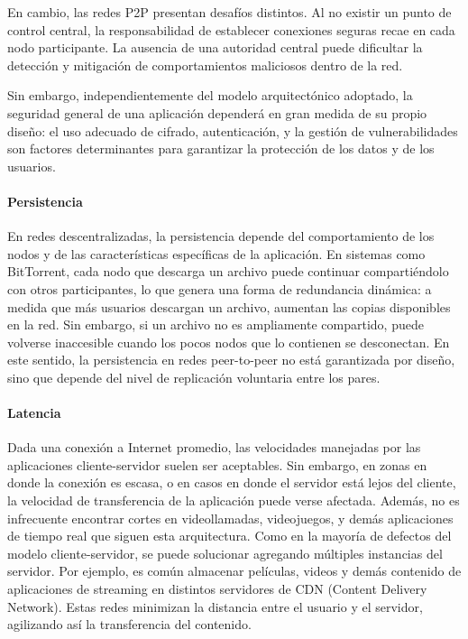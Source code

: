 En cambio, las redes P2P presentan desafíos distintos. Al no existir un punto de control central, la responsabilidad de establecer conexiones seguras recae en cada nodo participante. La ausencia de una autoridad central puede dificultar la detección y mitigación de comportamientos maliciosos dentro de la red.

Sin embargo, independientemente del modelo arquitectónico adoptado, la seguridad general de una aplicación dependerá en gran medida de su propio diseño: el uso adecuado de cifrado, autenticación, y la gestión de vulnerabilidades son factores determinantes para garantizar la protección de los datos y de los usuarios.

\paragraph{Persistencia}

En redes descentralizadas, la persistencia depende del comportamiento de los nodos y de las características específicas de la aplicación. En sistemas como BitTorrent, cada nodo que descarga un archivo puede continuar compartiéndolo con otros participantes, lo que genera una forma de redundancia dinámica: a medida que más usuarios descargan un archivo, aumentan las copias disponibles en la red. Sin embargo, si un archivo no es ampliamente compartido, puede volverse inaccesible cuando los pocos nodos que lo contienen se desconectan. En este sentido, la persistencia en redes peer-to-peer no está garantizada por diseño, sino que depende del nivel de replicación voluntaria entre los pares.

\paragraph{Latencia}
Dada una conexión a Internet promedio, las velocidades manejadas por las aplicaciones cliente-servidor suelen ser aceptables. Sin embargo, en zonas en donde la conexión es escasa, o en casos en donde el servidor está lejos del cliente, la velocidad de transferencia de la aplicación puede verse afectada. Además, no es infrecuente encontrar cortes en videollamadas, videojuegos, y demás aplicaciones de tiempo real que siguen esta arquitectura. Como en la mayoría de defectos del modelo cliente-servidor, se puede solucionar agregando múltiples instancias del servidor. Por ejemplo, es común almacenar  películas, videos y demás contenido de aplicaciones de streaming en distintos servidores de CDN (Content Delivery Network). Estas redes minimizan la distancia entre el usuario y el servidor, agilizando así la transferencia del contenido.

